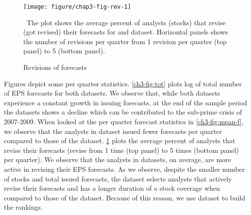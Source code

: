 \documentclass[a4paper,12pt,openright,notitlepage]{report}\usepackage[]{graphicx}\usepackage[]{color}
\makeatletter
\def\maxwidth{ %
  \ifdim\Gin@nat@width>\linewidth
    \linewidth
  \else
    \Gin@nat@width
  \fi
}
\newenvironment{knitrout}{}{} %
\makeatother
\begin{document}
%
%
%

\begin{figure}
\begin{knitrout}
\color{fgcolor}
\texttt{[image: figure/chap3-fig-rev-1]} 

\end{knitrout}
\caption{Revisions of forecasts}
\ The plot shows the average percent of analysts (stocks) that revise (got revised) their forecasts for \sample{} and \filtered{} dataset. Horizontal panels shows the number of revisions per quarter from 1 revision per quarter (top panel) to 5 (bottom panel).
\label{ch3-fig:rev}
\end{figure}
Figures  depict some per quarter statistics. \ref{ch3-fig:tot} plots log of total number of EPS forecasts for both datasets. We observe that, while both datasets experience a constant growth in issuing forecasts, at the end of the sample period the \filtered{} datasets shows a decline which can be contributed to the sub-prime crisis of 2007-2009. When looked at the per quarter forecast statistics in \ref{ch3-fig:mean-f}, we observe that the analysts in \filtered{} dataset issued fewer forecasts per quarter compared to those of the \sample{} dataset. \ref{ch3-fig:rev} plots the average percent of analysts that revise their forecasts (revise from 1 time (top panel) to 5 times (bottom panel) per quarter). We observe that the analysts in \filtered{} datasets, on average, are more active in revising their EPS forecasts. As we observe, despite the smaller number of stocks and total issued forecasts, the \filtered{} dataset selects analysts that actively revise their forecasts and has a longer duration of a stock coverage when compared to those of the \sample{} dataset. Because of this reason, we use \filtered{} dataset to build the rankings.
\end{document}
